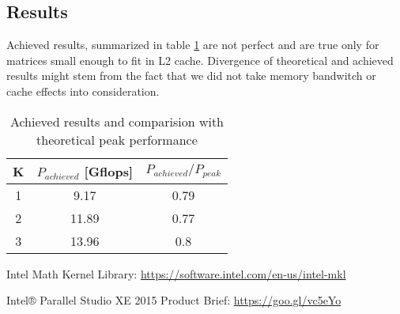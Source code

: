 \documentclass[journal, a4paper]{IEEEtran}
\begin{document}
   \subsection{Results}

  
  Achieved results, summarized in table \ref{tab:results} are not perfect and are true only for matrices small enough to fit in L2 cache. Divergence of theoretical and achieved results might stem from the fact that we did not take memory bandwitch or cache effects into consideration.
  
  \begin{table}[!hbt]
    \begin{center}
      \caption{Achieved results and comparision with theoretical peak performance}
      \label{tab:results}
      \begin{tabular}{c|c|c}
	K	& $P_{achieved}$ [Gflops] & $P_{achieved} / P_{peak}$\\
	\hline
	1	& 9.17 & 0.79 \\
	\hline
	2	& 11.89 & 0.77 \\
	\hline
	3	& 13.96 & 0.8
      \end{tabular}
    \end{center}
  \end{table}

   


\begin{thebibliography}{5}
	
	Intel Math Kernel Library: \url{https://software.intel.com/en-us/intel-mkl}
	
	Intel® Parallel Studio XE 2015 Product Brief: \url{https://goo.gl/vc5eYo}

\end{thebibliography}

\end{document}
